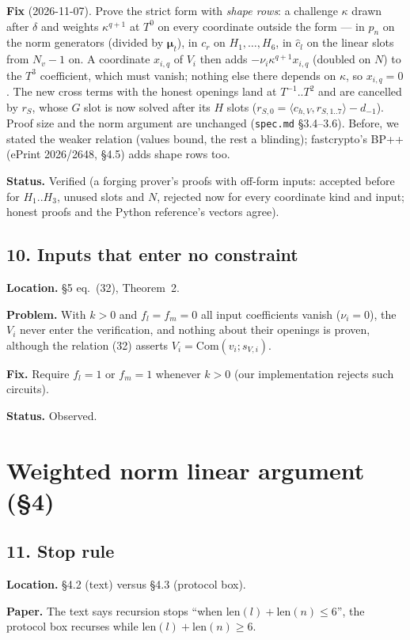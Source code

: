 \documentclass[11pt,a4paper]{article}
\newcommand{\status}[1]{\par\noindent\textbf{Status.} #1}
\newcommand{\loc}[1]{\par\noindent\textbf{Location.} #1}
\begin{document}
\noindent\textbf{Fix} (2026-11-07). Prove the strict form with \emph{shape rows}: a challenge
$\kappa$ drawn after $\delta$ and weights $\kappa^{q+1}$ at $T^0$ on every coordinate outside the form
--- in $p_n$ on the norm generators (divided by $\boldsymbol\mu_t$), in $c_r$ on $H_1, \dots, H_6$,
in $\hat c_l$ on the linear slots from $N_v - 1$ on. A coordinate $x_{i,q}$ of $V_i$ then adds
$-\nu_i \kappa^{q+1} x_{i,q}$ (doubled on $N$) to the $T^3$ coefficient, which must vanish; nothing
else there depends on $\kappa$, so $x_{i,q} = 0$. The new cross terms with the honest openings
land at $T^{-1}..T^2$ and are cancelled by $r_S$, whose $G$ slot is now solved after its $H$
slots ($r_{S,0} = \langle c_{h,V}, r_{S,1..7}\rangle - d_{-1}$). Proof size and the norm argument are
unchanged (\texttt{spec.md} \S3.4--3.6). Before, we stated the weaker relation (values bound, the
rest a blinding); fastcrypto's BP++ (ePrint 2026/2648, \S4.5) adds shape rows too.
\status{Verified (a forging prover's proofs with off-form inputs: accepted before for
$H_1..H_3$, unused slots and $N$, rejected now for every coordinate kind and input; honest
proofs and the Python reference's vectors agree).}

\subsection*{10. Inputs that enter no constraint}
\loc{\S5 eq.~(32), Theorem~2.}

\noindent\textbf{Problem.} With $k > 0$ and $f_l = f_m = 0$ all input coefficients vanish
($\nu_i = 0$), the $V_i$ never enter the verification, and nothing about their openings is
proven, although the relation (32) asserts $V_i = \mathrm{Com}(v_i; s_{V,i})$.

\noindent\textbf{Fix.} Require $f_l = 1$ or $f_m = 1$ whenever $k > 0$ (our implementation
rejects such circuits).
\status{Observed.}

\section{Weighted norm linear argument (\S4)}

\subsection*{11. Stop rule}
\loc{\S4.2 (text) versus \S4.3 (protocol box).}

\noindent\textbf{Paper.} The text says recursion stops ``when $\mathrm{len}(l) + \mathrm{len}(n)
\le 6$'', the protocol box recurses while $\mathrm{len}(l) + \mathrm{len}(n) \ge 6$.
\end{document}
